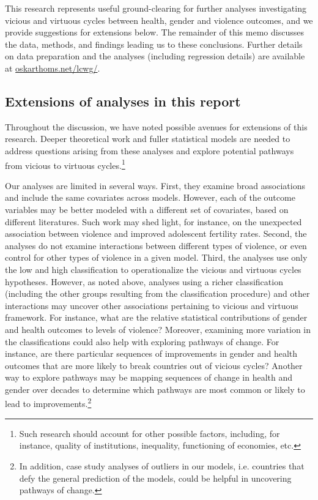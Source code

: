\documentclass[12pt]{article}
\begin{document}
This research represents useful ground-clearing for further analyses investigating vicious and virtuous cycles between health, gender and violence outcomes, and we provide suggestions for extensions below.
The remainder of this memo discusses the data, methods, and findings leading us to these conclusions. Further details on data preparation and the analyses (including regression details) are available at \href{oskarthoms.net/lcwg/}{oskarthoms.net/lcwg/}.


\subsection{Extensions of analyses in this report}




Throughout the discussion, we have noted possible avenues for extensions of this research.
Deeper theoretical work and fuller statistical models are needed to address questions arising from these analyses and explore potential pathways from vicious to virtuous cycles.\footnote{Such research should account for other possible factors, including, for instance, quality of institutions, inequality, functioning of economies, etc.}

Our analyses are limited in several ways.
First, they examine broad associations and include the same covariates across models.
However, each of the outcome variables may be better modeled with a different set of covariates, based on different literatures.
Such work may shed light, for instance, on the unexpected association between violence and improved adolescent fertility rates.
Second, the analyses do not examine interactions between different types of violence, or even control for other types of violence in a given model.
Third, the analyses use only the low and high classification to operationalize the vicious and virtuous cycles hypotheses.
However, as noted above, analyses using a richer classification (including the other groups resulting from the classification procedure) and other interactions may uncover other associations pertaining to vicious and virtuous framework.
For instance, what are the relative statistical contributions of gender and health outcomes to levels of violence?
Moreover, examining more variation in the classifications could also help with exploring pathways of change. For instance, are there particular sequences of improvements in gender and health outcomes that are more likely to break countries out of vicious cycles?
Another way to explore pathways may be mapping sequences of change in health and gender over decades to determine which pathways are most common or likely to lead to improvements.\footnote{In addition, case study analyses of outliers in our models, i.e. countries that defy the general prediction of the models, could be helpful in uncovering pathways of change.}
\end{document}
